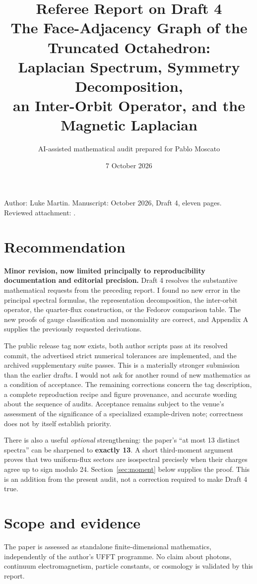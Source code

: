\documentclass[11pt,a4paper]{article}
\title{Referee Report on Draft 4\\[4pt]\large The Face-Adjacency Graph of the Truncated Octahedron:\\Laplacian Spectrum, Symmetry Decomposition,\\an Inter-Orbit Operator, and the Magnetic Laplacian}
\author{AI-assisted mathematical audit prepared for Pablo Moscato}
\date{7 October 2026}
\begin{document}
\maketitle
\begin{center}\small
Author: Luke Martin. Manuscript: October 2026, Draft 4, eleven pages.\\
Reviewed attachment: .
\end{center}

\section*{Recommendation}
\textbf{Minor revision, now limited principally to reproducibility documentation and editorial precision.} Draft 4 resolves the substantive mathematical requests from the preceding report. I found no new error in the principal spectral formulas, the representation decomposition, the inter-orbit operator, the quarter-flux construction, or the Fedorov comparison table. The new proofs of gauge classification and monomiality are correct, and Appendix A supplies the previously requested derivations.

The public release tag now exists, both author scripts pass at its resolved commit, the advertised strict numerical tolerances are implemented, and the archived supplementary suite passes. This is a materially stronger submission than the earlier drafts. I would not ask for another round of new mathematics as a condition of acceptance. The remaining corrections concern the tag description, a complete reproduction recipe and figure provenance, and accurate wording about the sequence of audits. Acceptance remains subject to the venue's assessment of the significance of a specialized example-driven note; correctness does not by itself establish priority.

There is also a useful \emph{optional} strengthening: the paper's ``at most 13 distinct spectra'' can be sharpened to \textbf{exactly 13}. A short third-moment argument proves that two uniform-flux sectors are isospectral precisely when their charges agree up to sign modulo 24. Section~\ref{sec:moment} below supplies the proof. This is an addition from the present audit, not a correction required to make Draft 4 true.

\section{Scope and evidence}
The paper is assessed as standalone finite-dimensional mathematics, independently of the author's UFFT programme. No claim about photons, continuum electromagnetism, particle constants, or cosmology is validated by this report.
\end{document}

